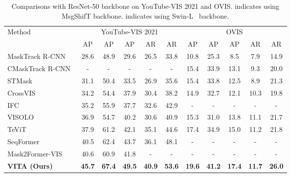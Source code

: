 \documentclass{article}
\begin{document}
\begin{table}
\centering
\caption{
Comparisons with ResNet-50 backbone on YouTube-VIS 2021 and OVIS.
 indicates using MsgShifT backbone.
 indicates using Swin-L~\cite{Swin} backbone.
} \resizebox{\linewidth}{!}
{ \begin{tabular}{@{}l|ccccc|ccccc@{}}
\toprule
\multirow{2}{*}{Method}                 & \multicolumn{5}{c|}{YouTube-VIS 2021}                 & \multicolumn{5}{c}{OVIS}\\
                                        & AP    & AP & AP & AR  & AR & AP    & AP & AP & AR  & AR \\
\midrule
\midrule
MaskTrack R-CNN~\cite{MaskTrackRCNN}    & 28.6  & 48.9      & 29.6      & 26.5      & 33.8      & 10.8  & 25.3      & 8.5       & 7.9       & 14.9  \\
CMaskTrack R-CNN~\cite{OVIS}            & -     & -         & -         & -         & -         & 15.4  & 33.9      & 13.1      & 9.3       & 20.0  \\
STMask~\cite{STMask}                    & 31.1  & 50.4      & 33.5      & 26.9      & 35.6      & 15.4  & 33.8      & 12.5      & 8.9       & 21.3  \\
CrossVIS~\cite{CrossVIS}                & 34.2  & 54.4      & 37.9      & 30.4      & 38.2      & 14.9  & 32.7      & 12.1      & 10.3      & 19.8  \\
IFC~\cite{IFC}                          & 35.2  & 55.9      & 37.7      & 32.6      & 42.9      & -     & -         & -         & -         & -     \\
VISOLO~\cite{VISOLO}                    & 36.9  & 54.7      & 40.2      & 30.6      & 40.9      & 15.3  & 31.0      & 13.8      & 11.1      & 21.7  \\
TeViT~\cite{TeViT}            & 37.9  & 61.2      & 42.1      & 35.1      & 44.6      & 17.4  & 34.9      & 15.0      & 11.2      & 21.8  \\
SeqFormer~\cite{SeqFormer}              & 40.5  & 62.4      & 43.7      & 36.1      & 48.1      & -     & -         & -         & -         & -     \\
Mask2Former-VIS~\cite{Mask2Former-VIS}  & 40.6  & 60.9      & 41.8      & -         & -         & -     & -         & -         & -         & -     \\
\midrule
\textbf{VITA (Ours)}                    & \textbf{45.7} & \textbf{67.4} & \textbf{49.5} & \textbf{40.9} & \textbf{53.6} & \textbf{19.6} & \textbf{41.2} & \textbf{17.4} & \textbf{11.7} & \textbf{26.0}\\

\end{tabular}}
\end{table}
\end{document}
